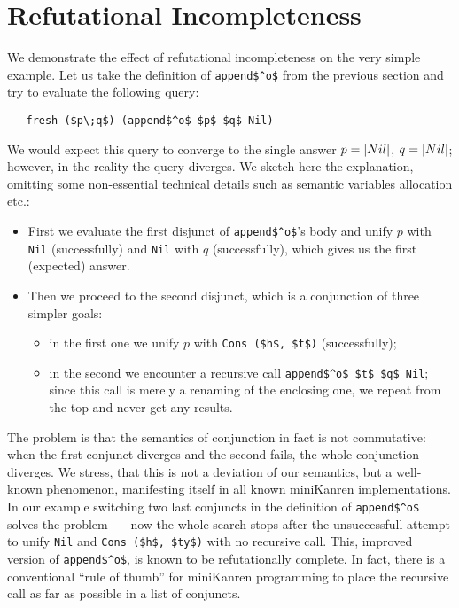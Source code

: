 \section{Refutational Incompleteness}

We demonstrate the effect of refutational incompleteness on the very simple example. Let us take the
definition of \lstinline{append$^o$} from the previous section and try to evaluate the following query:

\begin{lstlisting}
   fresh ($p\;q$) (append$^o$ $p$ $q$ Nil)
\end{lstlisting}

We would expect this query to converge to the single answer \mbox{$p=\lstinline|Nil|$}, \mbox{$q=\lstinline|Nil|$};
however, in the reality the query diverges. We sketch here the explanation, omitting some non-essential technical
details such as semantic variables allocation etc.:

\begin{itemize}
\item First we evaluate the first disjunct of \lstinline|append$^o$|'s body and unify $p$ with \lstinline|Nil| (successfully)
and \lstinline|Nil| with $q$ (successfully), which gives us the first (expected) answer.

\item Then we proceed to the second disjunct, which is a conjunction of three simpler goals:

  \begin{itemize} 
     \item in the first one we unify $p$ with \lstinline|Cons ($h$, $t$)| (successfully);
     \item in the second we encounter a recursive call \lstinline|append$^o$ $t$ $q$ Nil|; since this call is merely a renaming of
the enclosing one, we repeat from the top and never get any results.
  \end{itemize} 
\end{itemize}

The problem is that the semantics of conjunction in fact is not commutative: when the first conjunct diverges and the second fails, the whole
conjunction diverges. We stress, that this is not a deviation of our semantics, but a well-known phenomenon, manifesting itself in all known
miniKanren implementations. In our example switching two last conjuncts in the definition of \lstinline|append$^o$| solves the problem~---
now the whole search stops after the unsuccessfull attempt to unify \lstinline|Nil| and \lstinline|Cons ($h$, $ty$)| with no recursive call.
This, improved version of \lstinline|append$^o$|, is known to be refutationally complete. In fact, there is a conventional ``rule of thumb''
for miniKanren programming to place the recursive call as far as possible in a list of conjuncts. 

